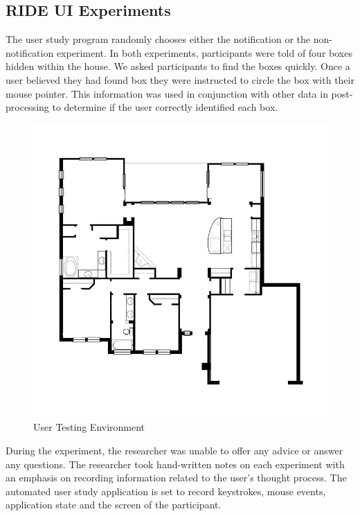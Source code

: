 \subsection{RIDE UI Experiments} %
\label{sub:ride_ui_experiments}
The user study program randomly chooses either the notification or the non-notification experiment. In both experiments, participants were told of four boxes hidden within the house. We asked participants to find the boxes quickly. Once a user believed they had found box they were instructed to circle the box with their mouse pointer. This information was used in conjunction with other data in post-processing to determine if the user correctly identified each box.

\begin{figure}[ht]
\begin{center}
\includegraphics[width=5in]{images/generic-house.png}
\caption{User Testing Environment\label{fig:test-environment}}
\end{center}
\end{figure}

During the experiment, the researcher was unable to offer any advice or answer any questions. The researcher took hand-written notes on each experiment with an emphasis on recording information related to the user's thought process. The automated user study application is set to record keystrokes, mouse events, application state and the screen of the participant.


